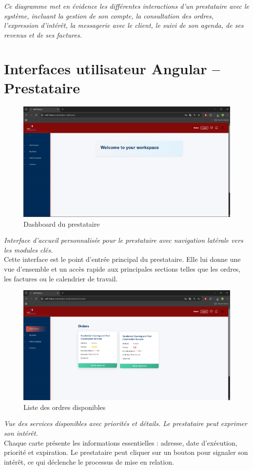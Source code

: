 \textit{Ce diagramme met en évidence les différentes interactions d’un prestataire avec le système, incluant la gestion de son compte, la consultation des ordres, l’expression d’intérêt, la messagerie avec le client, le suivi de son agenda, de ses revenus et de ses factures.}

\section*{Interfaces utilisateur Angular – Prestataire}

\begin{figure}[H]
\centering
\includegraphics[width=0.85\linewidth]{figures/helper dashboard.png}
\caption{Dashboard du prestataire}
\end{figure}
\textit{Interface d’accueil personnalisée pour le prestataire avec navigation latérale vers les modules clés.}\\
Cette interface est le point d’entrée principal du prestataire. Elle lui donne une vue d’ensemble et un accès rapide aux principales sections telles que les ordres, les factures ou le calendrier de travail.

\begin{figure}[H]
\centering
\includegraphics[width=0.85\linewidth]{figures/orders.png}
\caption{Liste des ordres disponibles}
\end{figure}
\textit{Vue des services disponibles avec priorités et détails. Le prestataire peut exprimer son intérêt.}\\
Chaque carte présente les informations essentielles : adresse, date d’exécution, priorité et expiration. Le prestataire peut cliquer sur un bouton pour signaler son intérêt, ce qui déclenche le processus de mise en relation.


